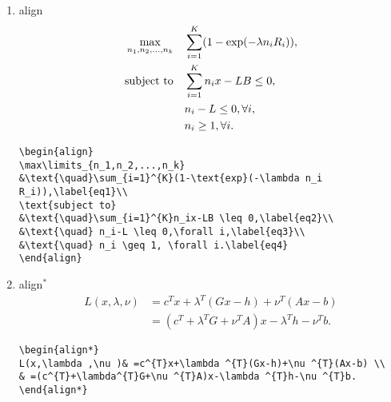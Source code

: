 \begin{enumerate}
\begin{lstlisting}[language=Tex]
\begin{align}
\begin{aligned}
& \text{minimize}
& & c^{T}x+b \\
& \text{subject to}
& & Gx\preceq h \\
&&& Ax=b,
\end{aligned}
\end{align}
\end{lstlisting}

\item align
\begin{align}
\max\limits_{n_1,n_2,...,n_k}
&\text{\quad}\sum_{i=1}^{K}(1-\text{exp}(-\lambda n_i R_i)),\label{eq1}\\
\text{subject to}
&\text{\quad}\sum_{i=1}^{K}n_ix-LB \leq 0,\label{eq2}\\
&\text{\quad} n_i-L \leq 0,\forall i,\label{eq3}\\
&\text{\quad} n_i \geq 1, \forall i.\label{eq4}
\end{align}

\begin{lstlisting}[language=Tex]
\begin{align}
\max\limits_{n_1,n_2,...,n_k}
&\text{\quad}\sum_{i=1}^{K}(1-\text{exp}(-\lambda n_i R_i)),\label{eq1}\\
\text{subject to}
&\text{\quad}\sum_{i=1}^{K}n_ix-LB \leq 0,\label{eq2}\\
&\text{\quad} n_i-L \leq 0,\forall i,\label{eq3}\\
&\text{\quad} n_i \geq 1, \forall i.\label{eq4}
\end{align}
\end{lstlisting}

\item align$^{\ast}$
\begin{align*}
L(x,\lambda ,\nu )& =c^{T}x+\lambda ^{T}(Gx-h)+\nu ^{T}(Ax-b) \\
& =(c^{T}+\lambda^{T}G+\nu ^{T}A)x-\lambda ^{T}h-\nu ^{T}b.
\end{align*}

\begin{lstlisting}[language=Tex]
\begin{align*}
L(x,\lambda ,\nu )& =c^{T}x+\lambda ^{T}(Gx-h)+\nu ^{T}(Ax-b) \\
& =(c^{T}+\lambda^{T}G+\nu ^{T}A)x-\lambda ^{T}h-\nu ^{T}b.
\end{align*}
\end{lstlisting}


\end{enumerate}
